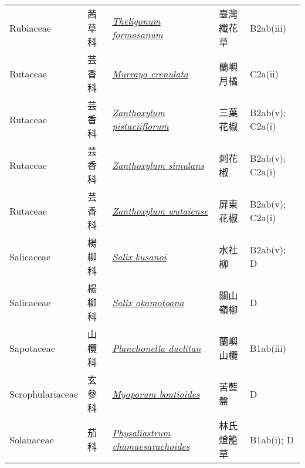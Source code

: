 {\begin{longtable}{p{2.5cm}p{2.5cm}p{4.5cm}p{2.5cm}p{3cm}}
    Rubiaceae & 茜草科 & \href{http://www.theplantlist.org/tpl1.1/search?q=Theligonum+formosanum}{\textit{Theligonum formosanum} } & 臺灣纖花草 & B2ab(iii) \index{Theligonum@\textit{Theligonum}!formosanum@\textit{formosanum}}  \index{臺灣纖花草} \\
    Rutaceae & 芸香科 & \href{http://www.theplantlist.org/tpl1.1/search?q=Murraya+crenulata}{\textit{Murraya crenulata} } & 蘭嶼月橘 & C2a(ii) \index{Murraya@\textit{Murraya}!crenulata@\textit{crenulata}}  \index{蘭嶼月橘} \\
    Rutaceae & 芸香科 & \href{http://www.theplantlist.org/tpl1.1/search?q=Zanthoxylum+pistaciiflorum}{\textit{Zanthoxylum pistaciiflorum} } & 三葉花椒 & B2ab(v); C2a(i) \index{Zanthoxylum@\textit{Zanthoxylum}!pistaciiflorum@\textit{pistaciiflorum}}  \index{三葉花椒} \\
    Rutaceae & 芸香科 & \href{http://www.theplantlist.org/tpl1.1/search?q=Zanthoxylum+simulans}{\textit{Zanthoxylum simulans} } & 刺花椒 & B2ab(v); C2a(i) \index{Zanthoxylum@\textit{Zanthoxylum}!simulans@\textit{simulans}}  \index{刺花椒} \\
    Rutaceae & 芸香科 & \href{http://www.theplantlist.org/tpl1.1/search?q=Zanthoxylum+wutaiense}{\textit{Zanthoxylum wutaiense} } & 屏東花椒 & B2ab(v); C2a(i) \index{Zanthoxylum@\textit{Zanthoxylum}!wutaiense@\textit{wutaiense}}  \index{屏東花椒} \\
    Salicaceae & 楊柳科 & \href{http://www.theplantlist.org/tpl1.1/search?q=Salix+kusanoi}{\textit{Salix kusanoi} } & 水社柳 & B2ab(v); D \index{Salix@\textit{Salix}!kusanoi@\textit{kusanoi}}  \index{水社柳} \\
    Salicaceae & 楊柳科 & \href{http://www.theplantlist.org/tpl1.1/search?q=Salix+okamotoana}{\textit{Salix okamotoana} } & 關山嶺柳 & D \index{Salix@\textit{Salix}!okamotoana@\textit{okamotoana}}  \index{關山嶺柳} \\
    Sapotaceae & 山欖科 & \href{http://www.theplantlist.org/tpl1.1/search?q=Planchonella+duclitan}{\textit{Planchonella duclitan} } & 蘭嶼山欖 & B1ab(iii) \index{Planchonella@\textit{Planchonella}!duclitan@\textit{duclitan}}  \index{蘭嶼山欖} \\
    Scrophulariaceae & 玄參科 & \href{http://www.theplantlist.org/tpl1.1/search?q=Myoporum+bontioides}{\textit{Myoporum bontioides} } & 苦藍盤 & D \index{Myoporum@\textit{Myoporum}!bontioides@\textit{bontioides}}  \index{苦藍盤} \\
    Solanaceae & 茄科 & \href{http://www.theplantlist.org/tpl1.1/search?q=Physaliastrum+chamaesarachoides}{\textit{Physaliastrum chamaesarachoides} } & 林氏燈籠草 & B1ab(i); D \index{Physaliastrum@\textit{Physaliastrum}!chamaesarachoides@\textit{chamaesarachoides}}  \index{林氏燈籠草} \\

\end{longtable}}
